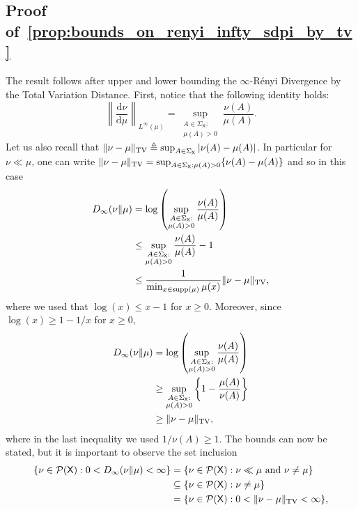 \documentclass[conference,letterpaper]{IEEEtran}
\def \X{\mathsf X}
\def \calP{\mathcal P}
\def \supp {\mathrm{supp}}
\newcommand{\dd}[1]{\mathrm{d}#1}
\begin{document}
\subsection{Proof of~\cref{prop:bounds_on_renyi_infty_sdpi_by_tv}}\label{appendix:proof_bounds_on_renyi_infty_sdpi_by_tv}\noindent
    The result follows after upper and lower bounding the $\infty$-R\'enyi Divergence by the Total Variation Distance. First, notice that the following identity holds:
    \begin{equation*}
        \left\|\frac{\dd\nu}{\dd\mu}\right\|_{L^\infty(\mu)}= \sup_{\substack{A\in\Sigma_\X:\\\mu(A)>0}} \frac{\nu(A)}{\mu(A)}.
    \end{equation*}
    Let us also recall that ${\|\nu-\mu\|_{\rm TV} \triangleq \sup_{A\in\Sigma_\X}|\nu(A)-\mu(A)|}$. In particular for $\nu\ll\mu$, one can write ${\|\nu-\mu\|_{\rm TV} = \sup_{A\in\Sigma_\X:\mu(A)>0}\{\nu(A)-\mu(A)\}}$ and so in this case
    \begin{align*}
        D_\infty(\nu\|\mu) &= \log\left(\sup_{\substack{A\in\Sigma_\X:\\\mu(A)>0}} \frac{\nu(A)}{\mu(A)}\right)\\
        &\leq \sup_{\substack{A\in\Sigma_\X:\\\mu(A)>0}} \frac{\nu(A)}{\mu(A)}-1\\
        &\leq \frac1{\min_{x\in\supp(\mu)}\mu(x)}\|\nu-\mu\|_{\rm TV},
    \end{align*}
    where we used that $\log(x)\leq x-1$ for $x\geq 0$. Moreover, since $\log(x)\geq1-1/x$ for $x\geq 0$,
    \begin{align*}
        D_\infty(\nu\|\mu) &= \log\left(\sup_{\substack{A\in\Sigma_\X:\\\mu(A)>0}} \frac{\nu(A)}{\mu(A)}\right)\\
        &\geq \sup_{\substack{A\in\Sigma_\X:\\\mu(A)>0}} \left\{1-\frac{\mu(A)}{\nu(A)}\right\}\\
        &\geq \|\nu-\mu\|_{\rm TV},
    \end{align*}
    where in the last inequality we used $1/\nu(A)\geq 1$. The bounds can now be stated, but it is important to observe the set inclusion
    \begin{align}
        \{\nu\in\calP(\X): 0<D_\infty(\nu\|\mu)<\infty\} &= \{\nu\in\calP(\X): \nu\ll\mu \text{ and } \nu\neq\mu\}\nonumber \\&\subseteq \{\nu\in\calP(\X): \nu\neq\mu\}\label{eq:set_inclusion} \\&= \{\nu\in\calP(\X): 0<\|\nu-\mu\|_{\rm TV}<\infty\},\nonumber
    \end{align}
\end{document}
